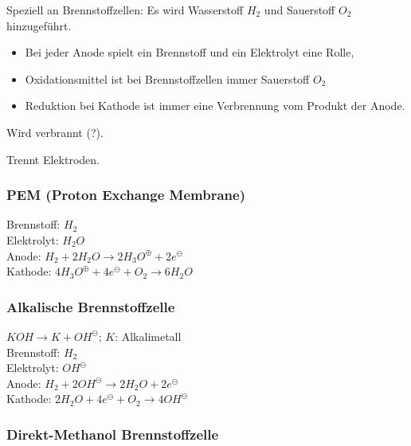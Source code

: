 
Speziell an Brennstoffzellen: Es wird Wasserstoff $H_2$ und Sauerstoff $O_2$ hinzugeführt.

\begin{itemize}
	\item Bei jeder Anode spielt ein Brennstoff und ein Elektrolyt eine Rolle,
	\item Oxidationsmittel ist bei Brennstoffzellen immer Sauerstoff $O_2$
	\item Reduktion bei Kathode ist immer eine Verbrennung vom Produkt der Anode.
\end{itemize}

\begin{definition}[Brennstoff]
	Wird verbrannt (?).
\end{definition}

\begin{definition}[Elektrolyt]
	Trennt Elektroden.
\end{definition}

\subsubsection{PEM (Proton Exchange Membrane)}

Brennstoff: $H_2$\\

Elektrolyt: $H_2O$\\

Anode: $H_2 + 2H_2O \rightarrow 2 H_3O^\oplus + 2e^\ominus$\\

Kathode: $4 H_3O^\oplus + 4e^\ominus + O_2 \rightarrow 6 H_2O$

\subsubsection{Alkalische Brennstoffzelle}

$KOH \rightarrow K + OH^\ominus$; $K$: Alkalimetall\\

Brennstoff: $H_2$\\

Elektrolyt: $OH^\ominus$\\

Anode: $H_2 + 2 OH^\ominus \rightarrow 2H_2O+2e^\ominus$\\

Kathode: $2 H_2O + 4e^\ominus + O_2 \rightarrow 4 OH^\ominus$

\subsubsection{Direkt-Methanol Brennstoffzelle}


